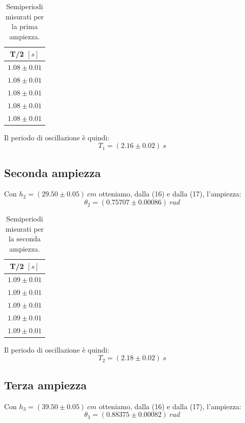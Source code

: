 \documentclass[11pt]{article}
\begin{document}
\begin{table}[H]
\centering
\begin{tabular}{|c|}
\hline
\textbf{T/2 $[s]$} \\
\hline
$1.08\pm 0.01$ \\
$1.08\pm 0.01$ \\
$1.08\pm 0.01$ \\
$1.08\pm 0.01$ \\
$1.08\pm 0.01$ \\
\hline
\end{tabular}
\caption{Semiperiodi misurati per la prima ampiezza.}
\label{tab:}
\end{table}
Il periodo di oscillazione è quindi:
\begin{equation}
    T_1=(2.16\pm 0.02)\ s
\end{equation}

\subsection{Seconda ampiezza}
Con $h_2 = (29.50\pm 0.05)\ cm$ otteniamo, dalla (16) e dalla (17), l'ampiezza:
\begin{equation}
    \theta_2 = (0.75707\pm 0.00086)\ rad
\end{equation}

\begin{table}[H]
\centering
\begin{tabular}{|c|}
\hline
\textbf{T/2 $[s]$} \\
\hline
$1.09\pm 0.01$ \\
$1.09\pm 0.01$ \\
$1.09\pm 0.01$ \\
$1.09\pm 0.01$ \\
$1.09\pm 0.01$ \\
\hline
\end{tabular}
\caption{Semiperiodi misurati per la seconda ampiezza.}
\label{tab:}
\end{table}
Il periodo di oscillazione è quindi:
\begin{equation}
    T_2=(2.18\pm 0.02)\ s
\end{equation}

\subsection{Terza ampiezza}
Con $h_3= (39.50\pm 0.05)\ cm$ otteniamo, dalla (16) e dalla (17), l'ampiezza:
\begin{equation}
    \theta_3 = (0.88375\pm 0.00082)\ rad
\end{equation}
\end{document}
